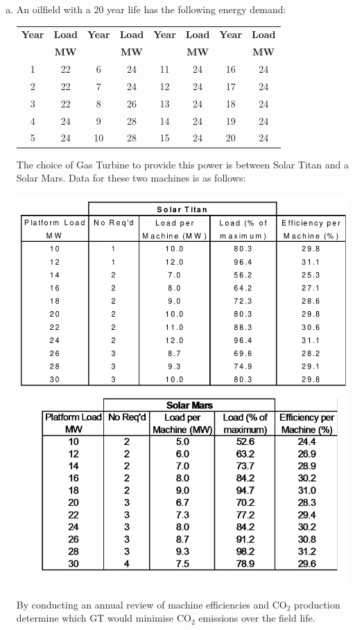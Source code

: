 \documentclass[calculator,datasheet,resit]{exam}
\begin{document}
\clearpage

\begin{question}
\begin{enumerate}[(a)]
%
\item An oilfield with a 20 year life has the following energy demand:
\begin{center}
\begin{tabular}{c c |c c |c c |c c}
\hline
{\bf Year} & {\bf Load} & {\bf Year} & {\bf Load} & {\bf Year} & {\bf Load} & {\bf Year} & {\bf Load} \\
           & {\bf MW}   &            &   {\bf MW} &            &  {\bf MW}  &            &   {\bf MW} \\
\hline
1          & 22         & 6          & 24         & 11         & 24         & 16         & 24 \\
2          & 22         & 7          & 24         & 12         & 24         & 17         & 24 \\
3          & 22         & 8          & 26         & 13         & 24         & 18         & 24 \\
4          & 24         & 9          & 28         & 14         & 24         & 19         & 24 \\
5          & 24         & 10         & 28         & 15         & 24         & 20         & 24 \\
\hline
\end{tabular}
\end{center}
The choice of Gas Turbine to provide this power is between Solar Titan and a Solar Mars. Data for these two machines is as follows:
\begin{center}
\includegraphics[width=0.8\columnwidth]{./Pics/EG5597_Process_4_June_2014-5.pdf} 
\end{center} 
By conducting an annual review of machine efficiencies and CO$_{2}$ production determine which GT would minimise CO$_{2}$ emissions over the field life.~


\end{enumerate}
\end{question}
\end{document}
